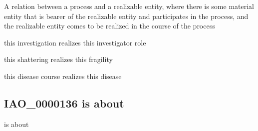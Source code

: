 \documentclass[letterpaper,10pt,english]{sphinxmanual}
\begin{document}
\begin{sphinxShadowBox}

\sphinxAtStartPar
{}
\end{sphinxShadowBox}

\begin{sphinxShadowBox}

\sphinxAtStartPar
A relation between a process and a realizable entity, where there is some material entity that is bearer of the realizable entity and participates in the process, and the realizable entity comes to be realized in the course of the process
\end{sphinxShadowBox}

\begin{sphinxShadowBox}

\sphinxAtStartPar
this investigation realizes this investigator role

\sphinxAtStartPar
this shattering realizes this fragility

\sphinxAtStartPar
this disease course realizes this disease
\end{sphinxShadowBox}

\begin{sphinxShadowBox}

\sphinxAtStartPar
{}
\end{sphinxShadowBox}
\begin{quote}

\ignorespaces \end{quote}


\subsection{IAO\_0000136 \sphinxhyphen{} is about}
\label{\detokenize{doc-IAO_0000136:iao-0000136-is-about}}\label{\detokenize{doc-IAO_0000136:index-0}}\label{\detokenize{doc-IAO_0000136::doc}}
\begin{sphinxShadowBox}

\sphinxAtStartPar
is about
\end{sphinxShadowBox}
\end{document}
